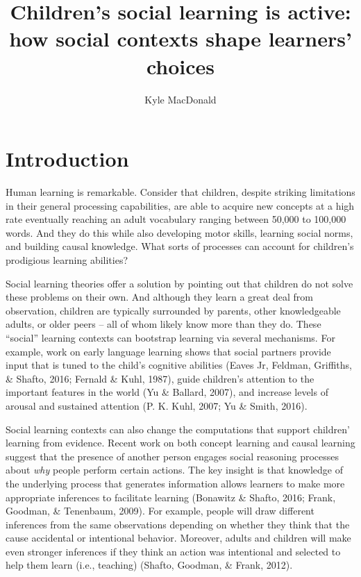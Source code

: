 \documentclass[a4paper,man,apacite,floatsintext]{apa6}
\date{}
\title{\textbf{Children's social learning is active: how social contexts shape
learners' choices}}
\author{Kyle MacDonald}
\affiliation{Department of Psychology, Stanford University}
\begin{document}
\maketitle

\section{Introduction}\label{introduction}

Human learning is remarkable. Consider that children, despite striking
limitations in their general processing capabilities, are able to
acquire new concepts at a high rate eventually reaching an adult
vocabulary ranging between 50,000 to 100,000 words. And they do this
while also developing motor skills, learning social norms, and building
causal knowledge. What sorts of processes can account for children's
prodigious learning abilities?

Social learning theories offer a solution by pointing out that children
do not solve these problems on their own. And although they learn a
great deal from observation, children are typically surrounded by
parents, other knowledgeable adults, or older peers -- all of whom
likely know more than they do. These ``social'' learning contexts can
bootstrap learning via several mechanisms. For example, work on early
language learning shows that social partners provide input that is tuned
to the child's cognitive abilities (Eaves Jr, Feldman, Griffiths, \&
Shafto, 2016; Fernald \& Kuhl, 1987), guide children's attention to the
important features in the world (Yu \& Ballard, 2007), and increase
levels of arousal and sustained attention (P. K. Kuhl, 2007; Yu \&
Smith, 2016).

Social learning contexts can also change the computations that support
children' learning from evidence. Recent work on both concept learning
and causal learning suggest that the presence of another person engages
social reasoning processes about \emph{why} people perform certain
actions. The key insight is that knowledge of the underlying process
that generates information allows learners to make more appropriate
inferences to facilitate learning (Bonawitz \& Shafto, 2016; Frank,
Goodman, \& Tenenbaum, 2009). For example, people will draw different
inferences from the same observations depending on whether they think
that the cause accidental or intentional behavior. Moreover, adults and
children will make even stronger inferences if they think an action was
intentional and selected to help them learn (i.e., teaching) (Shafto,
Goodman, \& Frank, 2012).
\end{document}
